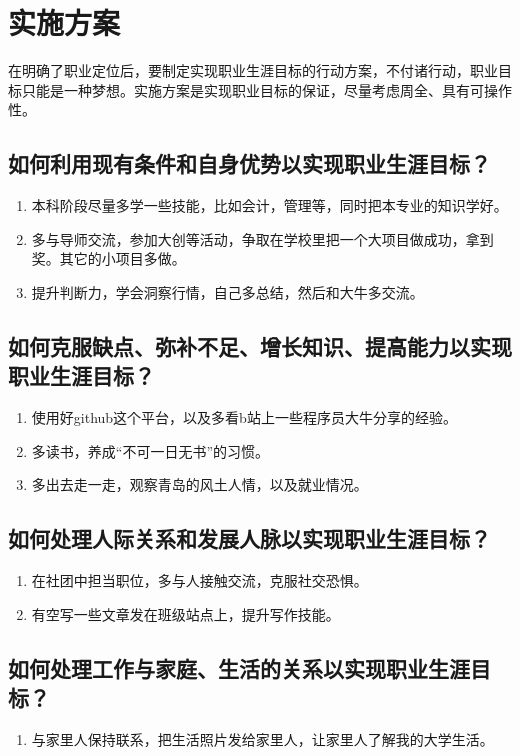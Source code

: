 \documentclass{article}
\begin{document}
\section{实施方案}
在明确了职业定位后，要制定实现职业生涯目标的行动方案，不付诸行动，职业目标只能是一种梦想。实施方案是实现职业目标的保证，尽量考虑周全、具有可操作性。\par


 \subsection{如何利用现有条件和自身优势以实现职业生涯目标？}
 \begin{enumerate}
 \item 本科阶段尽量多学一些技能，比如会计，管理等，同时把本专业的知识学好。
 \item 多与导师交流，参加大创等活动，争取在学校里把一个大项目做成功，拿到奖。其它的小项目多做。
\item 提升判断力，学会洞察行情，自己多总结，然后和大牛多交流。
 \end{enumerate}
  \subsection{如何克服缺点、弥补不足、增长知识、提高能力以实现职业生涯目标？}
 \begin{enumerate}
 	\item 使用好github这个平台，以及多看b站上一些程序员大牛分享的经验。
 	\item 多读书，养成“不可一日无书”的习惯。
 	\item 多出去走一走，观察青岛的风土人情，以及就业情况。
 	\end{enumerate}
  \subsection{如何处理人际关系和发展人脉以实现职业生涯目标？}
 \begin{enumerate}
\item 在社团中担当职位，多与人接触交流，克服社交恐惧。
\item 有空写一些文章发在班级站点上，提升写作技能。
 \end{enumerate}
  \subsection{如何处理工作与家庭、生活的关系以实现职业生涯目标？}
 \begin{enumerate}
\item 与家里人保持联系，把生活照片发给家里人，让家里人了解我的大学生活。
 \end{enumerate}
\end{document}
